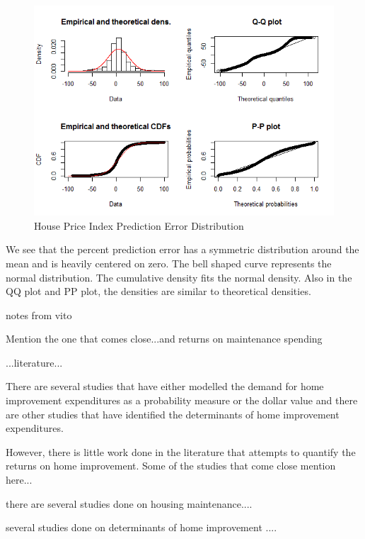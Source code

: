 \begin{figure}[!htb]
    \centering
     \includegraphics[width=\columnwidth]{Figures/Rplot_qqplot.png} \par
 \caption{House Price Index Prediction Error Distribution}
 \label{fig:Rplot_ssd_err_10}
\end{figure}

We see that the percent prediction error has a symmetric distribution around the mean and is heavily centered on zero. The bell shaped curve represents the normal distribution. The cumulative density fits the normal density. Also in the QQ plot and PP plot, the densities are similar to theoretical densities.


 
 
 
 notes from vito
 
 

Mention the one that comes close...and returns on maintenance spending

...literature...


There are several studies that have either modelled the demand for home improvement expenditures as a probability measure or the dollar value and there are other studies that have identified the determinants of home improvement expenditures. 




However, there is little work done in the literature that attempts to quantify the returns on home improvement. Some of the studies that come close mention here...

there are several studies done on housing maintenance....

several studies done on determinants of home improvement ....





